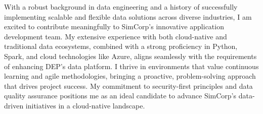 
With a robust background in data engineering and a history of successfully implementing scalable and flexible data solutions across diverse industries, I am excited to contribute meaningfully to SimCorp's innovative application development team.
 My extensive experience with both cloud-native and traditional data ecosystems, combined with a strong proficiency in Python, Spark, and cloud technologies like Azure, aligns seamlessly with the requirements of enhancing DEP's data platform.
 I thrive in environments that value continuous learning and agile methodologies, bringing a proactive, problem-solving approach that drives project success.
 My commitment to security-first principles and data quality assurance positions me as an ideal candidate to advance SimCorp's data-driven initiatives in a cloud-native landscape.

